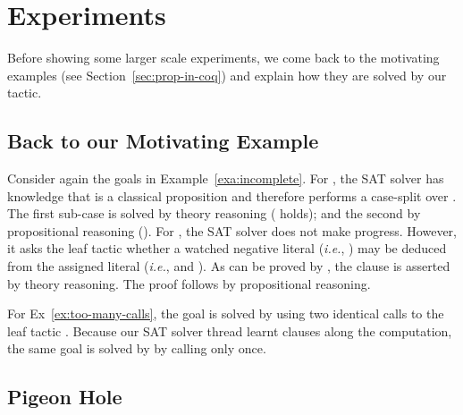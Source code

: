 \documentclass[a4paper,UKenglish,cleveref, autoref, thm-restate]{lipics-v2019}
\begin{document}
\section{Experiments}
\label{sec:experiments}

Before showing some larger scale experiments, we come back to the
motivating examples (see Section~\ref{sec:prop-in-coq}) and explain how
they are solved by our tactic.

\subsection{Back to our Motivating Example}

Consider again the goals in Example~\ref{exa:incomplete}.  For
, the SAT solver has knowledge that  is a classical
proposition and therefore performs a case-split over .
The first sub-case is solved by theory reasoning (
holds); and the second by propositional reasoning ().
%
For , the SAT solver does not make progress. However, it
asks the leaf tactic  whether a watched negative
literal (\emph{i.e.}, ) may be deduced from the assigned
literal (\emph{i.e.},  and ).
%
As  can be proved by ,
the clause is asserted by theory reasoning. The proof follows by
propositional reasoning.

For Ex~\ref{ex:too-many-calls}, the goal is solved by  using two identical calls to the leaf tactic .
%
Because our SAT solver thread learnt clauses along the computation,
the same goal is solved by  by calling  only once.

\subsection{Pigeon Hole}
\end{document}
